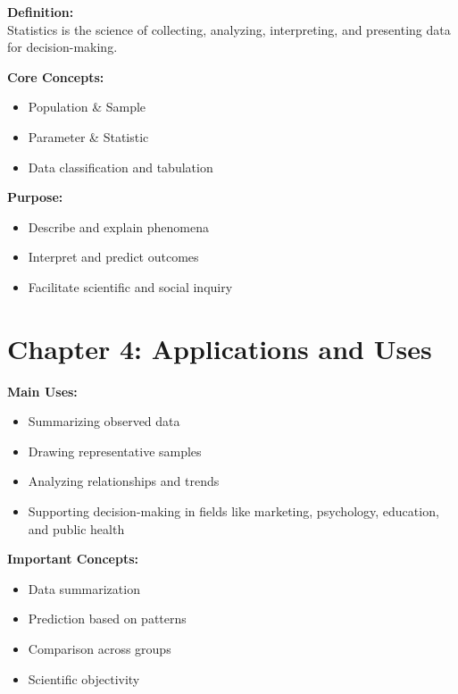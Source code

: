 \documentclass[
  letterpaper,
  DIV=11,
  numbers=noendperiod]{scrreprt}
\providecommand{\tightlist}{%
  \setlength{\itemsep}{0pt}\setlength{\parskip}{0pt}}
\begin{document}
\textbf{Definition:}\\
Statistics is the science of collecting, analyzing, interpreting, and
presenting data for decision-making.

\textbf{Core Concepts:}

\begin{itemize}
\tightlist
\item
  Population \& Sample\\
\item
  Parameter \& Statistic\\
\item
  Data classification and tabulation
\end{itemize}

\textbf{Purpose:}

\begin{itemize}
\tightlist
\item
  Describe and explain phenomena\\
\item
  Interpret and predict outcomes\\
\item
  Facilitate scientific and social inquiry
\end{itemize}


\chapter{Chapter 4: Applications and
Uses}\label{chapter-4-applications-and-uses}

\textbf{Main Uses:}

\begin{itemize}
\tightlist
\item
  Summarizing observed data\\
\item
  Drawing representative samples\\
\item
  Analyzing relationships and trends\\
\item
  Supporting decision-making in fields like marketing, psychology,
  education, and public health
\end{itemize}

\textbf{Important Concepts:}

\begin{itemize}
\tightlist
\item
  Data summarization\\
\item
  Prediction based on patterns\\
\item
  Comparison across groups\\
\item
  Scientific objectivity
\end{itemize}
\end{document}
